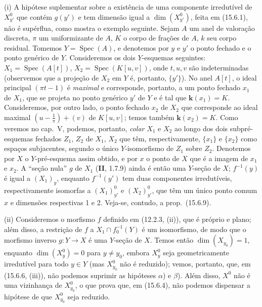 \begin{remarks}[15.6.10]
\label{IV.15.6.10}
(i) A hipótese suplementar sobre a existência de uma componente irredutível de $X_{y'}^0$ que contém $g(y')$ e tem dimensão igual a $\dim(X_{y'}^0)$, feita em (15.6.1), não é supérflua, como mostra o exemplo seguinte. Sejam $A$ um anel de valoração discreta, $\pi$ um uniformizante de $A$, $K$ o corpo de frações de $A$, $k$ seu corpo residual. Tomemos $Y=\operatorname{Spec}(A)$, e denotemos por $y$ e $y'$ o ponto fechado e o ponto genérico de $Y$. Consideremos os dois $Y$-esquemas seguintes: $X_1=\operatorname{Spec}(A[t])$, $X_2=\operatorname{Spec}(K[u,v])$, onde $t,u,v$ são indeterminadas (observemos que a projeção de $X_2$ em $Y$ é, portanto, $\{y'\}$). No anel $A[t]$, o ideal principal $(\pi t-1)$ é \emph{maximal} e corresponde, portanto, a um ponto fechado $x_1$ de $X_1$, que se projeta no ponto genérico $y'$ de $Y$ e é tal que $\mathbf{k}(x_1)=K$.
Consideremos, por outro lado, o ponto fechado $x_2$ de $X_2$ que corresponde ao ideal maximal $\left(u-\frac{1}{\pi}\right)+(v)$ de $K[u,v]$; temos também $\mathbf{k}(x_2)=K$. Como veremos no cap.~V, podemos, portanto, \emph{colar} $X_1$ e $X_2$ ao longo dos dois subpré-esquemas fechados $Z_1$, $Z_2$ de $X_1$, $X_2$ que têm, respectivamente, $\{x_1\}$ e $\{x_2\}$ como espaços subjacentes, segundo o único $Y$-isomorfismo de $Z_1$ sobre $Z_2$. Denotemos por $X$ o $Y$-pré-esquema assim obtido, e por $x$ o ponto de $X$ que é a imagem de $x_1$ e $x_2$. A ``seção nula'' $g$ de $X_1$ (\textbf{II}, 1.7.9) ainda é então uma $Y$-seção de $X$; $f^{-1}(y)$ é igual a $(X_1)_y$, enquanto $f^{-1}(y')$ tem duas componentes irredutíveis, respectivamente isomorfas a $(X_1)_{y'}^0$ e $(X_2)_{y'}^0$, que têm um único ponto comum $x$ e dimensões respectivas 1 e 2. Veja-se, contudo, a prop.~(15.6.9).

(ii) Consideremos o morfismo $f$ definido em (12.2.3, (ii)), que é próprio e plano; além disso, a restrição de $f$ a $X_1\cap f_0^{-1}(Y)$ é um isomorfismo, de modo que o morfismo inverso $g:Y\to X$ é uma $Y$-seção de $X$. Temos então $\dim(X_{y_0})=1$, enquanto $\dim(X_y^0)=0$ para $y\ne y_0$, embora $X_y^0$ seja geometricamente irredutível para todo $y\in Y$ (mas $X_{y_0}^0$ não é reduzido); vemos, portanto, que, em (15.6.6, (iii)), não podemos suprimir as hipóteses $\alpha$) e $\beta$). Além disso, $X^0$ não é uma vizinhança de $X_{y_0}^{0}$, o que prova que, em (15.6.4), não podemos dispensar a hipótese de que $X_{y_0}^0$ seja reduzido.


\end{remarks}
